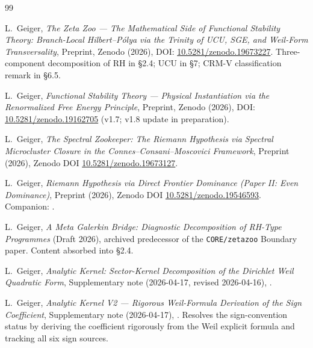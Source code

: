 \documentclass[10pt,twocolumn]{article}
\theoremstyle{definition}
\theoremstyle{remark}
\begin{document}
\begin{thebibliography}{99}


L.~Geiger,
\textit{The Zeta Zoo --- The Mathematical Side of Functional
Stability Theory: Branch-Local Hilbert--P\'olya via the Trinity of
UCU, SGE, and Weil-Form Transversality},
Preprint, Zenodo (2026), DOI:
\href{https://doi.org/10.5281/zenodo.19673227}{10.5281/zenodo.19673227}.
Three-component decomposition of $\mathrm{RH}$ in \S2.4; UCU in \S7;
CRM-V classification remark in \S6.5.

L.~Geiger,
\textit{Functional Stability Theory --- Physical Instantiation via
the Renormalized Free Energy Principle},
Preprint, Zenodo (2026), DOI:
\href{https://doi.org/10.5281/zenodo.19162705}{10.5281/zenodo.19162705}
(v1.7; v1.8 update in preparation).

L.~Geiger,
\textit{The Spectral Zookeeper: The Riemann Hypothesis via Spectral
Microcluster Closure in the Connes--Consani--Moscovici Framework},
Preprint (2026), Zenodo DOI
\href{https://doi.org/10.5281/zenodo.19673127}{10.5281/zenodo.19673127}.


L.~Geiger,
\textit{Riemann Hypothesis via Direct Frontier Dominance (Paper II:
Even Dominance)},
Preprint (2026), Zenodo DOI \href{https://doi.org/10.5281/zenodo.19546593}{10.5281/zenodo.19546593}.
Companion: .

L.~Geiger,
\textit{A Meta Galerkin Bridge: Diagnostic Decomposition of RH-Type
Programmes}
(Draft 2026), archived predecessor of the \texttt{CORE/zetazoo}
Boundary paper. Content absorbed into \cite{MathMaster} \S2.4.

L.~Geiger,
\textit{Analytic Kernel: Sector-Kernel Decomposition of the
Dirichlet Weil Quadratic Form},
Supplementary note (2026-04-17, revised 2026-04-16),
.

L.~Geiger,
\textit{Analytic Kernel V2 --- Rigorous Weil-Formula Derivation
of the Sign Coefficient},
Supplementary note (2026-04-17),
.
Resolves the sign-convention status by deriving the coefficient
rigorously from the Weil explicit formula and tracking all six sign
sources.


\end{thebibliography}
\end{document}
